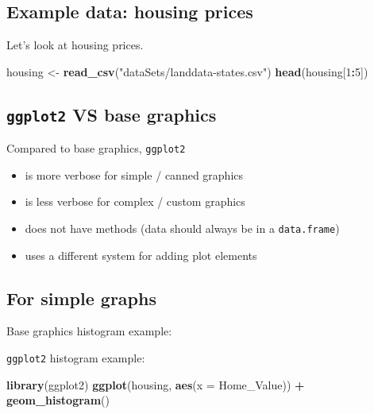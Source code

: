 \documentclass[]{book}
\newenvironment{Shaded}{\begin{snugshade}}{\end{snugshade}}
\newcommand{\KeywordTok}[1]{\textcolor[rgb]{0.13,0.29,0.53}{\textbf{#1}}}
\newcommand{\DataTypeTok}[1]{\textcolor[rgb]{0.13,0.29,0.53}{#1}}
\newcommand{\DecValTok}[1]{\textcolor[rgb]{0.00,0.00,0.81}{#1}}
\newcommand{\StringTok}[1]{\textcolor[rgb]{0.31,0.60,0.02}{#1}}
\newcommand{\OperatorTok}[1]{\textcolor[rgb]{0.81,0.36,0.00}{\textbf{#1}}}
\newcommand{\NormalTok}[1]{#1}
\providecommand{\tightlist}{%
  \setlength{\itemsep}{0pt}\setlength{\parskip}{0pt}}
\begin{document}
\subsection{Example data: housing
prices}\label{example-data-housing-prices}

Let's look at housing prices.

\begin{Shaded}
\begin{Highlighting}[]
\NormalTok{housing <-}\StringTok{ }\KeywordTok{read_csv}\NormalTok{(}\StringTok{"dataSets/landdata-states.csv"}\NormalTok{)}
\KeywordTok{head}\NormalTok{(housing[}\DecValTok{1}\OperatorTok{:}\DecValTok{5}\NormalTok{])}
\end{Highlighting}
\end{Shaded}

\subsection{\texorpdfstring{\texttt{ggplot2} VS base
graphics}{ggplot2 VS base graphics}}\label{ggplot2-vs-base-graphics}

Compared to base graphics, \texttt{ggplot2}

\begin{itemize}
\tightlist
\item
  is more verbose for simple / canned graphics
\item
  is less verbose for complex / custom graphics
\item
  does not have methods (data should always be in a \texttt{data.frame})
\item
  uses a different system for adding plot elements
\end{itemize}

\subsection{For simple graphs}\label{for-simple-graphs}

Base graphics histogram example:

\begin{Shaded}
\end{Shaded}

\texttt{ggplot2} histogram example:

\begin{Shaded}
\begin{Highlighting}[]
\KeywordTok{library}\NormalTok{(ggplot2)}
\KeywordTok{ggplot}\NormalTok{(housing, }\KeywordTok{aes}\NormalTok{(}\DataTypeTok{x =}\NormalTok{ Home_Value)) }\OperatorTok{+}
\StringTok{  }\KeywordTok{geom_histogram}\NormalTok{()}
\end{Highlighting}
\end{Shaded}
\end{document}
